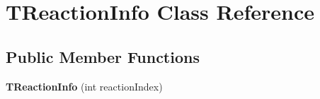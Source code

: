 \hypertarget{class_t_reaction_info}{\section{T\-Reaction\-Info Class Reference}
\label{class_t_reaction_info}
}
\subsection*{Public Member Functions}
\begin{DoxyCompactItemize}
\item 
\hypertarget{class_t_reaction_info_a897fe2f798e86e5be23df16ffc700cb5}{{\bfseries T\-Reaction\-Info} (int reaction\-Index)}\label{class_t_reaction_info_a897fe2f798e86e5be23df16ffc700cb5}

\end{DoxyCompactItemize}

